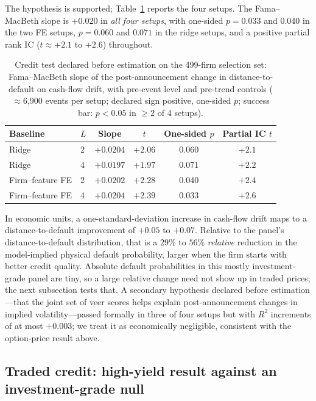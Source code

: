 \documentclass[pdflatex,sn-mathphys-num]{sn-jnl}%
\theoremstyle{thmstyleone}%
\theoremstyle{thmstyletwo}%
\theoremstyle{thmstylethree}%
\begin{document}
The hypothesis is supported; Table~\ref{Tab:H1_DD} reports the four setups. The Fama--MacBeth slope is $+0.020$ in \emph{all four setups}, with one-sided $p = 0.033$ and $0.040$ in the two FE setups, $p = 0.060$ and $0.071$ in the ridge setups, and a positive partial rank IC ($t \approx +2.1$ to $+2.6$) throughout.

\begin{table}[!htbp]
\centering
\caption{Credit test declared before estimation on the 499-firm selection set: Fama--MacBeth slope of the post-announcement change in distance-to-default on cash-flow drift, with pre-event level and pre-trend controls ($\approx$6{,}900 events per setup; declared sign positive, one-sided $p$; success bar: $p<0.05$ in $\geq 2$ of 4 setups).}
\label{Tab:H1_DD}
\begin{tabular}{llcccc}
\toprule
Baseline & $L$ & Slope & $t$ & One-sided $p$ & Partial IC $t$ \\
\midrule
Ridge              & 2 & $+0.0204$ & $+2.06$ & 0.060 & $+2.1$ \\
Ridge              & 4 & $+0.0197$ & $+1.97$ & 0.071 & $+2.2$ \\
Firm--feature FE & 2 & $+0.0202$ & $+2.28$ & 0.040 & $+2.4$ \\
Firm--feature FE & 4 & $+0.0204$ & $+2.39$ & 0.033 & $+2.6$ \\
\bottomrule
\end{tabular}
\end{table}
In economic units, a one-standard-deviation increase in cash-flow drift maps to a distance-to-default improvement of $+0.05$ to $+0.07$. Relative to the panel's distance-to-default distribution, that is a $29\%$ to $56\%$ \emph{relative} reduction in the model-implied physical default probability, larger when the firm starts with better credit quality. Absolute default probabilities in this mostly investment-grade panel are tiny, so a large relative change need not show up in traded prices; the next subsection tests that. A secondary hypothesis declared before estimation---that the joint set of veer scores helps explain post-announcement changes in implied volatility---passed formally in three of four setups but with $R^2$ increments of at most $+0.003$; we treat it as economically negligible, consistent with the option-price result above.

\subsection{Traded credit: high-yield result against an investment-grade null}
\label{Section:CDS}
\end{document}
